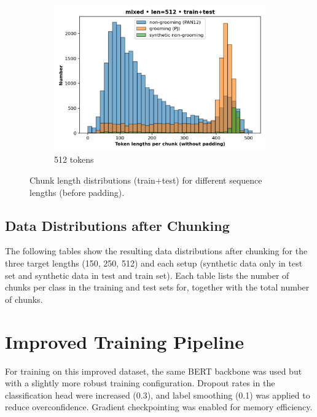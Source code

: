 \begin{figure}[H]
\begin{subfigure}[t]{0.34\textwidth}
    \includegraphics[width=\linewidth]{figures/chunking_512_dist.png}
    \caption{512 tokens}\label{fig:chunkdist512}
  \end{subfigure}
  \caption[Chunk Length Distributions]{Chunk length distributions (train+test) for different sequence lengths (before padding).}
  \label{fig:chunk-dists}
\end{figure}


\subsection{Data Distributions after Chunking}
 The following tables show the resulting data distributions after chunking for the three target lengths (150, 250, 512) and each setup (synthetic data only in test set and synthetic data in test and train set). Each table lists the number of chunks per class in the training and test sets for, together with the total number of chunks. 

 

 

 


\section{Improved Training Pipeline} \label{sec:improved-training-pipeline}


For training on this improved dataset, the same BERT backbone was used but with a slightly more robust training configuration. Dropout rates in the classification head were increased (0.3), and label smoothing (0.1) was applied to reduce overconfidence. Gradient checkpointing was enabled for memory efficiency. 

